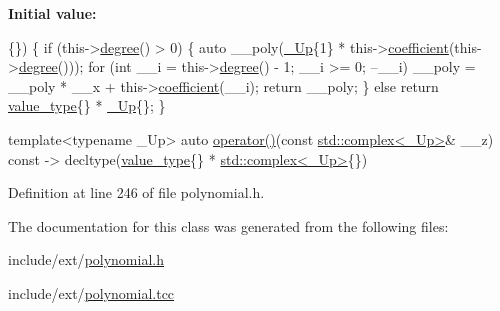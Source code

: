 {\bfseries Initial value\+:}
\begin{DoxyCode}
\{\})
        \{
          \textcolor{keywordflow}{if} (this->\hyperlink{class____gnu__cxx_1_1__Polynomial_a07d9933aeeb9afbd823218ed921336cb}{degree}() > 0)
            \{
              \textcolor{keyword}{auto} \_\_poly(\hyperlink{class____gnu__cxx_1_1__Polynomial_a242114d4b86648a5dff67a8221f80d40}{\_Up}\{1\} * this->\hyperlink{class____gnu__cxx_1_1__Polynomial_a7cee31b3acbe8c024af6d696bc610f49}{coefficient}(this->\hyperlink{class____gnu__cxx_1_1__Polynomial_a07d9933aeeb9afbd823218ed921336cb}{degree}()));
              \textcolor{keywordflow}{for} (\textcolor{keywordtype}{int} \_\_i = this->\hyperlink{class____gnu__cxx_1_1__Polynomial_a07d9933aeeb9afbd823218ed921336cb}{degree}() - 1; \_\_i >= 0; --\_\_i)
                \_\_poly = \_\_poly * \_\_x + this->\hyperlink{class____gnu__cxx_1_1__Polynomial_a7cee31b3acbe8c024af6d696bc610f49}{coefficient}(\_\_i);
              \textcolor{keywordflow}{return} \_\_poly;
            \}
          \textcolor{keywordflow}{else}
            \textcolor{keywordflow}{return} \hyperlink{class____gnu__cxx_1_1__Polynomial_a725563351f50e76084a7a016c06f8a53}{value\_type}\{\} * \hyperlink{class____gnu__cxx_1_1__Polynomial_a242114d4b86648a5dff67a8221f80d40}{\_Up}\{\};
        \}

      
      \textcolor{keyword}{template}<\textcolor{keyword}{typename} \_Up>
        \textcolor{keyword}{auto}
        \hyperlink{class____gnu__cxx_1_1__Polynomial_a9aa91f3424896c07d51fa09950825549}{operator()}(\textcolor{keyword}{const} \hyperlink{classstd_1_1complex}{std::complex<\_Up>}& \_\_z) \textcolor{keyword}{const}
        -> decltype(\hyperlink{class____gnu__cxx_1_1__Polynomial_a725563351f50e76084a7a016c06f8a53}{value\_type}\{\} * \hyperlink{classstd_1_1complex}{std::complex<\_Up>}\{\})
\end{DoxyCode}


Definition at line 246 of file polynomial.\+h.



The documentation for this class was generated from the following files\+:\begin{DoxyCompactItemize}
\item 
include/ext/\hyperlink{polynomial_8h}{polynomial.\+h}\item 
include/ext/\hyperlink{polynomial_8tcc}{polynomial.\+tcc}\end{DoxyCompactItemize}
